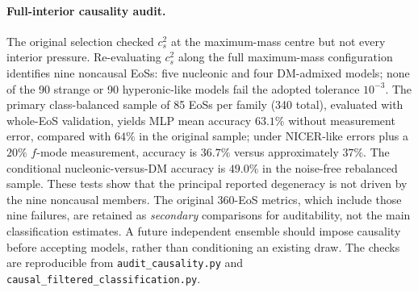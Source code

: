 \documentclass[11pt,a4paper]{article}
\begin{document}
\paragraph{Full-interior causality audit.} The original selection checked $c_s^2$ at the maximum-mass centre but not every interior pressure. Re-evaluating $c_s^2$ along the full maximum-mass configuration identifies nine noncausal EoSs: five nucleonic and four DM-admixed models; none of the 90 strange or 90 hyperonic-like models fail the adopted tolerance $10^{-3}$. The primary class-balanced sample of 85 EoSs per family (340 total), evaluated with whole-EoS validation, yields MLP mean accuracy $63.1\%$ without measurement error, compared with $64\%$ in the original sample; under NICER-like errors plus a $20\%$ $f$-mode measurement, accuracy is $36.7\%$ versus approximately $37\%$. The conditional nucleonic-versus-DM accuracy is $49.0\%$ in the noise-free rebalanced sample. These tests show that the principal reported degeneracy is not driven by the nine noncausal members. The original 360-EoS metrics, which include those nine failures, are retained as \emph{secondary} comparisons for auditability, not the main classification estimates. A future independent ensemble should impose causality before accepting models, rather than conditioning an existing draw. The checks are reproducible from \texttt{audit\_causality.py} and \texttt{causal\_filtered\_classification.py}.
\end{document}
